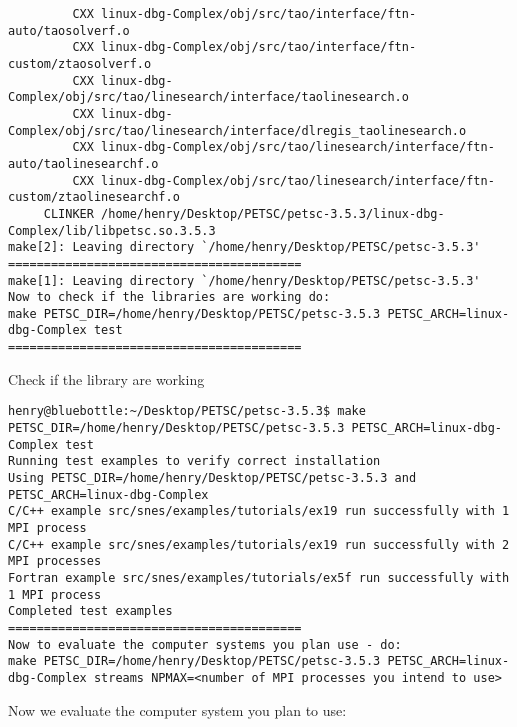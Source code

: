 \documentclass{article}
\begin{document}
\begin{scriptsize}
\begin{verbatim}
         CXX linux-dbg-Complex/obj/src/tao/interface/ftn-auto/taosolverf.o
         CXX linux-dbg-Complex/obj/src/tao/interface/ftn-custom/ztaosolverf.o
         CXX linux-dbg-Complex/obj/src/tao/linesearch/interface/taolinesearch.o
         CXX linux-dbg-Complex/obj/src/tao/linesearch/interface/dlregis_taolinesearch.o
         CXX linux-dbg-Complex/obj/src/tao/linesearch/interface/ftn-auto/taolinesearchf.o
         CXX linux-dbg-Complex/obj/src/tao/linesearch/interface/ftn-custom/ztaolinesearchf.o
     CLINKER /home/henry/Desktop/PETSC/petsc-3.5.3/linux-dbg-Complex/lib/libpetsc.so.3.5.3
make[2]: Leaving directory `/home/henry/Desktop/PETSC/petsc-3.5.3'
=========================================
make[1]: Leaving directory `/home/henry/Desktop/PETSC/petsc-3.5.3'
Now to check if the libraries are working do:
make PETSC_DIR=/home/henry/Desktop/PETSC/petsc-3.5.3 PETSC_ARCH=linux-dbg-Complex test
=========================================
\end{verbatim}              \end{scriptsize}
Check if the library are working
\begin{scriptsize}\begin{verbatim}
henry@bluebottle:~/Desktop/PETSC/petsc-3.5.3$ make PETSC_DIR=/home/henry/Desktop/PETSC/petsc-3.5.3 PETSC_ARCH=linux-dbg-Complex test
Running test examples to verify correct installation
Using PETSC_DIR=/home/henry/Desktop/PETSC/petsc-3.5.3 and PETSC_ARCH=linux-dbg-Complex
C/C++ example src/snes/examples/tutorials/ex19 run successfully with 1 MPI process
C/C++ example src/snes/examples/tutorials/ex19 run successfully with 2 MPI processes
Fortran example src/snes/examples/tutorials/ex5f run successfully with 1 MPI process
Completed test examples
=========================================
Now to evaluate the computer systems you plan use - do:
make PETSC_DIR=/home/henry/Desktop/PETSC/petsc-3.5.3 PETSC_ARCH=linux-dbg-Complex streams NPMAX=<number of MPI processes you intend to use>
\end{verbatim}              \end{scriptsize}
Now we evaluate the computer system you plan to use:
\end{document}
